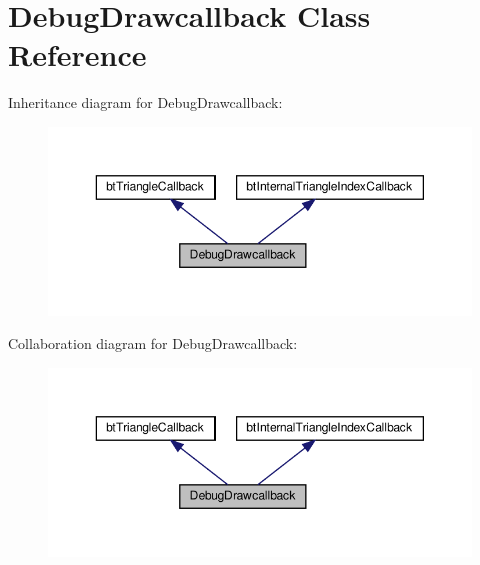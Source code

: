 \hypertarget{classDebugDrawcallback}{}\section{Debug\+Drawcallback Class Reference}
\label{classDebugDrawcallback}


Inheritance diagram for Debug\+Drawcallback\+:
\nopagebreak
\begin{figure}[H]
\begin{center}
\leavevmode
\includegraphics[width=350pt]{classDebugDrawcallback__inherit__graph}
\end{center}
\end{figure}


Collaboration diagram for Debug\+Drawcallback\+:
\nopagebreak
\begin{figure}[H]
\begin{center}
\leavevmode
\includegraphics[width=350pt]{classDebugDrawcallback__coll__graph}
\end{center}
\end{figure}
